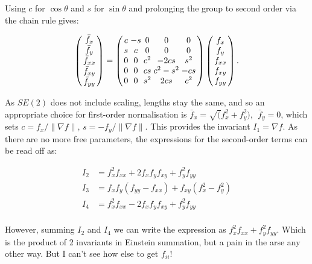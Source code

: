 \documentclass[review,onefignum,onetabnum]{siamonline190516}
\begin{document}
Using $c$ for $\cos \theta$ and $s$ for $\sin \theta$ and prolonging the group to second order via the chain rule gives:

\begin{equation}
\arraycolsep=1.4pt
\left(
\begin{array}{c}
  \bar f_x \\ \bar f_y \\ \bar f_{xx} \\ \bar f_{xy} \\ \bar f_{yy} 
 \end{array}
 \right)
 = 
\left(
\begin{array}{ccccc}
 c & -s & 0 & 0 & 0 \\
 s & c & 0 & 0 & 0 \\
0 & 0 & c^2 & -2cs & s^2 \\
0 & 0 & cs & c^2 - s^2 & -cs \\
0 & 0 & s^2 & 2cs & c^2 \\
\end{array}
\right)\left(
\begin{array}{c}
f_x \\ f_y \\ f_{xx} \\ f_{xy} \\ f_{yy} 
 \end{array}
 \right).
\label{eqn:SE2}
 \end{equation}

As $SE(2)$ does not include scaling, lengths stay the same, and so an appropriate choice for first-order normalisation is $\bar f_x = \sqrt(f_x^2 + f_y^2),\:\: \bar f_y = 0$, which sets $c = f_x / \| \nabla f \|$, $s = - f_y / \| \nabla f \|$. This provides the invariant $I_1 = \nabla f$. As there are no more free parameters, the expressions for the second-order terms can be read off as:

\begin{align}
I_2 &= f_x^2 f_{xx} + 2 f_x f_y f_{xy} + f_y^2 f_{yy} \\
I_3 &= f_x f_y (f_{yy} - f_{xx}) + f_{xy} (f_x^2 - f_y^2) \\
I_4 &= f_x^2 f_{xx} - 2 f_x f_y f_{xy} + f_y^2 f_{yy} \\
\end{align}

However, summing $I_2$ and $I_4$ we can write the expression as $f_x^2 f_{xx} + f_y^2 f_{yy}$. Which is the product of 2 invariants in Einstein summation, but a pain in the arse any other way. But I can't see how else to get $f_{ii}$!
\end{document}
